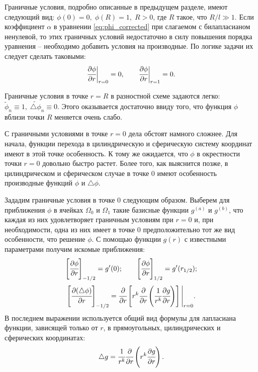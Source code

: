 Граничные условия, подробно описанные в предыдущем разделе, имеют следующий вид: $\phi(0) = 0, \; \phi(R) = 1, \; R > 0$, где $R$ такое, что $R / l \gg 1$. Если коэффициент $\alpha$ в уравнении \eqref{eq:phi_corrected} при слагаемом с билапласианом ненулевой, то этих граничных условий недостаточно в силу повышения порядка уравнения -- необходимо добавить условия на производные. По логике задачи их следует сделать таковыми:
$$\cfrac{\partial \phi}{\partial r} \bigg|_{r = 0} = 0, \qquad \cfrac{\partial \phi}{\partial r} \bigg|_{r = 1} = 0 {\text{.}}$$

Граничные условия в точке $r = R$ в разностной схеме задаются легко: $\widetilde{\phi}_n \equiv 1, \; \widetilde{\triangle \phi}_n \equiv 0$. Этого оказывается достаточно ввиду того, что функция $\phi$ вблизи точки $R$ меняется очень слабо.

С граничными условиями в точке $r = 0$ дела обстоят намного сложнее. Для начала, функции перехода в цилиндрическую и сферическую систему координат имеют в этой точке особенность. К тому же ожидается, что $\phi$ в окрестности точки $r = 0$ довольно быстро растет. Более того, как выяснится позже, в цилиндрическом и сферическом случае в точке $0$ имеют особенность производные функций $\phi$ и $\triangle \phi$.

Зададим граничные условия в точке $0$ следующим образом. Выберем для приближения $\phi$ в ячейках $\Omega_0$ и $\Omega_1$ такие базисные функции $g^{(a)}$ и $g^{(b)}$, что каждая из них удовлетворяет граничным условиям при $r = 0$ и, при необходимости, одна из них имеет в точке $0$ предположительно тот же вид особенности, что решение $\phi$. С помощью функции $g(r)$ с известными параметрами получим искомые приближения:
$$\left[ \cfrac{\partial \phi}{\partial r} \right]_{-1/2} = g'(0); \qquad \left[ \cfrac{\partial \phi}{\partial r} \right]_{1/2} = g'(r_{1/2}) {\text{;}}$$
$$\left[ \cfrac{\partial (\triangle \phi)}{\partial r} \right]_{-1/2} = \cfrac{\partial}{\partial r} \left[ r^k \cfrac{\partial}{\partial r} \left(\cfrac{1}{r^k} \cfrac{\partial g}{\partial r} \right) \right] \Bigg|_{r = 0} {\text{.}}$$
В последнем выражении используется общий вид формулы для лапласиана функции, зависящей только от $r$, в прямоугольных, цилиндрических и сферических координатах:
\begin{equation}
    \triangle g = \cfrac{1}{r^k} \cfrac{\partial}{\partial r} \left( r^k \cfrac{\partial g}{\partial r} \right) {\text{.}}
    \label{eq:laplasian_common}
\end{equation}

